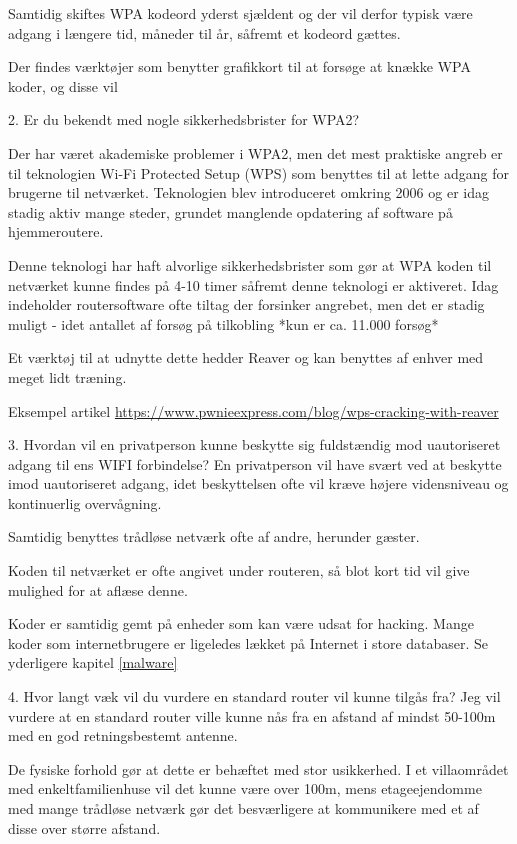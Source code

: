 \documentclass[a4paper,11pt,notitlepage]{report}
\begin{document}
Samtidig skiftes WPA kodeord yderst sjældent og der vil derfor typisk være adgang i længere tid, måneder til år, såfremt et kodeord gættes.

Der findes værktøjer som benytter grafikkort til at forsøge at knække WPA koder, og disse vil



2.  Er du bekendt med nogle sikkerhedsbrister for WPA2?

Der har været akademiske problemer i WPA2, men det mest praktiske angreb er til teknologien Wi-Fi Protected Setup (WPS) som benyttes til at lette adgang for brugerne til netværket. Teknologien blev introduceret omkring 2006 og er idag stadig aktiv mange steder, grundet manglende opdatering af software på hjemmeroutere.

Denne teknologi har haft alvorlige sikkerhedsbrister som gør at WPA koden til netværket kunne findes på 4-10 timer såfremt denne teknologi er aktiveret. Idag indeholder routersoftware ofte tiltag der forsinker angrebet, men det er stadig muligt - idet antallet af forsøg på tilkobling *kun er ca. 11.000 forsøg*

Et værktøj til at udnytte dette hedder Reaver og kan benyttes af enhver med meget lidt træning.

Eksempel artikel
\url{https://www.pwnieexpress.com/blog/wps-cracking-with-reaver}

3.  Hvordan vil en privatperson kunne beskytte sig fuldstændig mod uautoriseret adgang til ens WIFI forbindelse?
En privatperson vil have svært ved at beskytte imod uautoriseret adgang, idet beskyttelsen ofte vil kræve højere vidensniveau og kontinuerlig overvågning.

Samtidig benyttes trådløse netværk ofte af andre, herunder gæster.

Koden til netværket er ofte angivet under routeren, så blot kort tid vil give mulighed for at aflæse denne.

Koder er samtidig gemt på enheder som kan være udsat for hacking. Mange koder som internetbrugere er ligeledes lækket på Internet i store databaser.
Se yderligere kapitel \ref{malware}

4.  Hvor langt væk vil du vurdere en standard router vil kunne tilgås fra?
Jeg vil vurdere at en standard router ville kunne nås fra en afstand af mindst 50-100m med en god retningsbestemt antenne.

De fysiske forhold gør at dette er behæftet med stor usikkerhed. I et villaområdet med enkeltfamilienhuse vil det kunne være over 100m, mens etageejendomme med mange trådløse netværk gør det besværligere at kommunikere med et af disse over større afstand.
\end{document}
